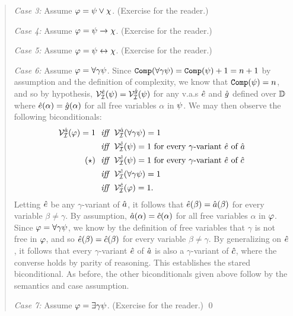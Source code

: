 \begin{quote}
  \textit{Case 3:}
  Assume $\varphi = \psi \vee \chi$.
  (Exercise for the reader.)

  \textit{Case 4:}
  Assume $\varphi = \psi \rightarrow \chi$.
  (Exercise for the reader.)

  \textit{Case 5:}
  Assume $\varphi = \psi \leftrightarrow \chi$.
  (Exercise for the reader.)

  \textit{Case 6:}
  Assume $\varphi = \forall \gamma\psi$.
  Since $\texttt{Comp}(\forall \gamma \psi) = \texttt{Comp}(\psi) + 1 = n + 1$ by assumption and the definition of complexity, we know that $\texttt{Comp}(\psi) = n$, and so by hypothesis, $\mathcal{V}_{\mathcal{I}}^{\hat{e}}(\psi)=\mathcal{V}_{\mathcal{I}}^{\hat{g}}(\psi)$ for any v.a.s $\hat{e}$ and $\hat{g}$ defined over $\mathbb{D}$ where $\hat{e}(\alpha) = \hat{g}(\alpha)$ for all free variables $\alpha$ in $\psi$.
  We may then observe the following biconditionals:
  \begin{align*}
    \mathcal{V}_{\mathcal{I}}^{\hat{a}}(\varphi) = 1
      ~~\textit{iff}~~  & \mathcal{V}_{\mathcal{I}}^{\hat{a}}(\forall \gamma \psi) = 1\\
      ~~\textit{iff}~~  & \mathcal{V}_{\mathcal{I}}^{\hat{e}}(\psi) = 1 \text{ for every $\gamma$-variant } \hat{e} \text{ of } \hat{a}\\
      (\star) ~~\textit{iff}~~  & \mathcal{V}_{\mathcal{I}}^{\hat{e}}(\psi) = 1 \text{ for every $\gamma$-variant } \hat{e} \text{ of } \hat{c}\\
      ~~\textit{iff}~~  & \mathcal{V}_{\mathcal{I}}^{\hat{c}}(\forall \gamma \psi) = 1\\
      ~~\textit{iff}~~  & \mathcal{V}_{\mathcal{I}}^{\hat{c}}(\varphi) = 1.
  \end{align*}
  Letting $\hat{e}$ be any $\gamma$-variant of $\hat{a}$, it follows that $\hat{e}(\beta) = \hat{a}(\beta)$ for every variable $\beta \neq \gamma$. 
  By assumption, $\hat{a}(\alpha) = \hat{c}(\alpha)$ for all free variables $\alpha$ in $\varphi$.
  Since $\varphi = \forall \gamma \psi$, we know by the definition of free variables that $\gamma$ is not free in $\varphi$, and so $\hat{e}(\beta) = \hat{c}(\beta)$ for every variable $\beta \neq \gamma$. 
  By generalizing on $\hat{e}$, it follows that every $\gamma$-variant $\hat{e}$ of $\hat{a}$ is also a $\gamma$-variant of $\hat{c}$, where the converse holds by parity of reasoning. 
  This establishes the stared biconditional.
  As before, the other biconditionals given above follow by the semantics and case assumption.

  \textit{Case 7:}
  Assume $\varphi = \exists \gamma\psi$.
  (Exercise for the reader.)
  \qed
\end{quote}



